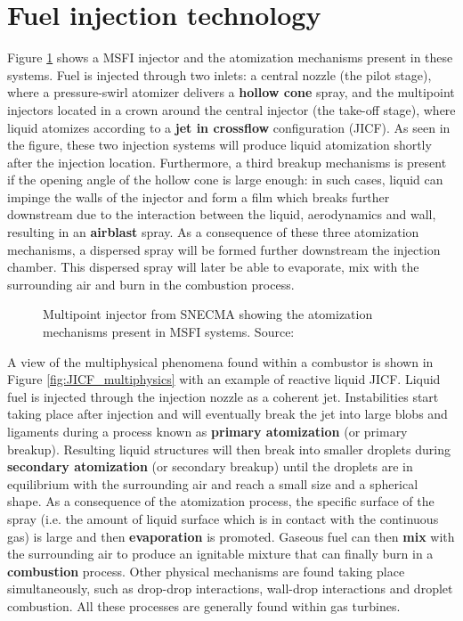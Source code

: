 \section{Fuel injection technology}
\label{sec:ch1_fuel_injection_technology}

Figure \ref{fig:multipoint_injector_snecma} shows a MSFI injector and the atomization mechanisms present in these systems. Fuel is injected through two inlets: a central nozzle (the pilot stage), where a pressure-swirl atomizer delivers a \textbf{hollow cone} spray, and the multipoint injectors located in a crown around the central injector (the take-off stage), where liquid atomizes according to a \textbf{jet in crossflow} configuration (JICF). As seen in the figure, these two injection systems will produce liquid atomization shortly after the injection location. Furthermore, a third breakup mechanisms is present if the opening angle of the hollow cone is large enough: in such cases, liquid can impinge the walls of the injector and form a film which breaks further downstream due to the interaction between the liquid, aerodynamics and wall, resulting in an \textbf{airblast} spray. As a consequence of these three atomization mechanisms, a dispersed spray will be formed further downstream the injection chamber. This dispersed spray will later be able to evaporate, mix with the surrounding air and burn in the combustion process.




\begin{figure}[ht]
     \centering
      \caption[Multipoint injector from Safran Aircraft Engines (SAE) showing the atomization mechanisms present in MSFI systems]{Multipoint injector from SNECMA showing the atomization mechanisms present in MSFI systems. Source: }
      \label{fig:multipoint_injector_snecma}
\end{figure}

A view of the multiphysical phenomena found within a combustor is shown in Figure \ref{fig:JICF_multiphysics} with an example of reactive liquid JICF. Liquid fuel is injected through the injection nozzle as a coherent jet. Instabilities start taking place after injection and will eventually break the jet into large blobs and ligaments during a process known as \textbf{primary atomization} (or primary breakup). Resulting liquid structures will then break into smaller droplets during \textbf{secondary atomization} (or secondary breakup) until the droplets are in equilibrium with the surrounding air and reach a small size and a spherical shape. As a consequence of the atomization process, the specific surface of the spray (i.e. the amount of liquid surface which is in contact with the continuous gas) is large and then \textbf{evaporation} is promoted. Gaseous fuel can then \textbf{mix} with the surrounding air  to produce an ignitable mixture that can finally burn in a \textbf{combustion} process. Other physical mechanisms are found taking place simultaneously, such as drop-drop interactions, wall-drop interactions and droplet combustion. All these processes are generally found within gas turbines.

